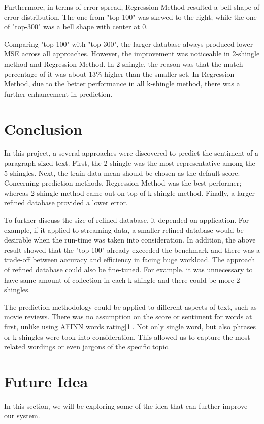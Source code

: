 Furthermore, in terms of error spread,  Regression Method resulted a bell shape of error distribution. The one from "top-100"  was skewed to the right; while the one of "top-300"  was a bell shape with center at 0.

Comparing "top-100" with "top-300", the larger database always produced lower MSE across all approaches. However, the improvement was noticeable in 2-shingle method and Regression Method. In 2-shingle, the reason was that the match percentage of it was about 13\% higher than the smaller set. In Regression Method, due to the better performance in all k-shingle method, there was a further enhancement in prediction.


\section{Conclusion}

In this project, a several approaches were discovered to predict the sentiment of a paragraph sized text. First, the 2-shingle was the most representative among the 5 shingles. Next, the train data mean should be chosen as the default score. Concerning prediction methods, Regression Method was the best performer; whereas 2-shingle method came out on top of k-shingle method. Finally, a larger refined database provided a lower error.

To further discuss the size of refined database, it depended on application. For example, if it applied to streaming data, a smaller refined database would be desirable when the run-time was taken into consideration. In addition, the above result showed that the "top-100" already exceeded the benchmark and there was a trade-off between accuracy and efficiency in facing huge workload. 
The approach of refined database could also be fine-tuned. For example, it was unnecessary to have same amount of collection in each k-shingle and there could be more 2-shingles.

The prediction methodology could be applied to different aspects of text, such as movie reviews. There was no assumption on the score or sentiment for words at first, unlike using AFINN words rating[1]. Not only single word, but also phrases or k-shingles were took into consideration. This allowed us to capture the most related wordings or even jargons of the specific topic.


\section{Future Idea}
In this section, we will be exploring some of the idea that can further improve our system.
